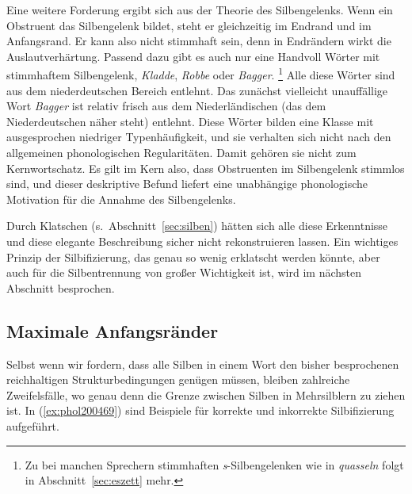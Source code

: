 \label{abs:silbengelenkstimmlos}
Eine weitere Forderung ergibt sich aus der Theorie des Silbengelenks.
Wenn ein Obstruent das Silbengelenk bildet, steht er gleichzeitig im Endrand und im Anfangsrand.
Er kann also nicht stimmhaft sein, denn in Endrändern wirkt die Auslautverhärtung.
\label{abs:robbe}Passend dazu gibt es auch nur eine Handvoll Wörter mit stimmhaftem Silbengelenk, \zB \textit{Kladde}, \textit{Robbe} oder \textit{Bagger}.%
\footnote{Zu bei manchen Sprechern stimmhaften \textit{s}-Silbengelenken wie in \textit{quasseln} folgt in Abschnitt~\ref{sec:eszett} mehr.}
Alle diese Wörter sind aus dem niederdeutschen Bereich entlehnt.
Das zunächst vielleicht unauffällige Wort \textit{Bagger} ist relativ frisch aus dem Niederländischen (das dem Niederdeutschen näher steht) entlehnt.
Diese Wörter bilden eine Klasse mit ausgesprochen niedriger Typenhäufigkeit, und sie verhalten sich nicht nach den allgemeinen phonologischen Regularitäten.
Damit gehören sie nicht zum Kernwortschatz.
Es gilt im Kern also, dass Obstruenten im Silbengelenk stimmlos sind, und dieser deskriptive Befund liefert eine unabhängige phonologische Motivation für die Annahme des Silbengelenks.

Durch Klatschen (s.\ Abschnitt~\ref{sec:silben}) hätten sich alle diese Erkenntnisse und diese elegante Beschreibung sicher nicht rekonstruieren lassen.
Ein wichtiges Prinzip der Silbifizierung, das genau so wenig erklatscht werden könnte, aber auch für die Silbentrennung von großer Wichtigkeit ist, wird im nächsten Abschnitt besprochen.


\subsection{Maximale Anfangsränder}

\label{sec:maximaleanfangsraender}

Selbst wenn wir fordern, dass alle Silben in einem Wort den bisher besprochenen reichhaltigen Strukturbedingungen genügen müssen, bleiben zahlreiche Zweifelsfälle, wo genau denn die Grenze zwischen Silben in Mehrsilblern zu ziehen ist.
In (\ref{ex:phol200469}) sind Beispiele für korrekte und inkorrekte Silbifizierung aufgeführt.


\begin{exe}
  \ex \label{ex:phol200469}
  \begin{xlist}
  \end{xlist}
\end{exe}

